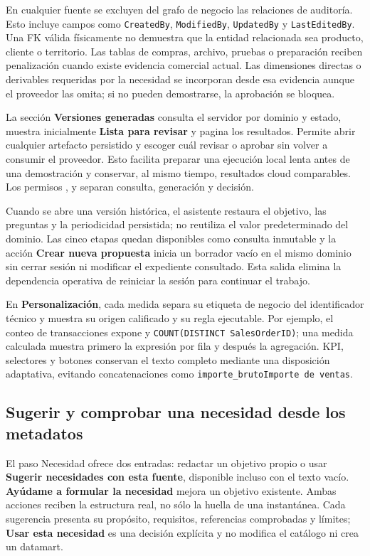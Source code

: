 \documentclass[11pt,letterpaper]{article}
\newcommand{\file}[1]{\texttt{#1}}
\begin{document}
En cualquier fuente se excluyen del grafo de negocio las relaciones de auditoría. Esto incluye campos como \file{CreatedBy}, \file{ModifiedBy}, \file{UpdatedBy} y \file{LastEditedBy}. Una FK válida físicamente no demuestra que la entidad relacionada sea producto, cliente o territorio. Las tablas de compras, archivo, pruebas o preparación reciben penalización cuando existe evidencia comercial actual. Las dimensiones directas o derivables requeridas por la necesidad se incorporan desde esa evidencia aunque el proveedor las omita; si no pueden demostrarse, la aprobación se bloquea.

La sección \textbf{Versiones generadas} consulta el servidor por dominio y estado, muestra inicialmente \textbf{Lista para revisar} y pagina los resultados. Permite abrir cualquier artefacto persistido y escoger cuál revisar o aprobar sin volver a consumir el proveedor. Esto facilita preparar una ejecución local lenta antes de una demostración y conservar, al mismo tiempo, resultados cloud comparables. Los permisos ,  y  separan consulta, generación y decisión.

Cuando se abre una versión histórica, el asistente restaura el objetivo, las preguntas y la periodicidad persistida; no reutiliza el valor predeterminado del dominio. Las cinco etapas quedan disponibles como consulta inmutable y la acción \textbf{Crear nueva propuesta} inicia un borrador vacío en el mismo dominio sin cerrar sesión ni modificar el expediente consultado. Esta salida elimina la dependencia operativa de reiniciar la sesión para continuar el trabajo.

En \textbf{Personalización}, cada medida separa su etiqueta de negocio del identificador técnico y muestra su origen calificado y su regla ejecutable. Por ejemplo, el conteo de transacciones expone  y \file{COUNT(DISTINCT SalesOrderID)}; una medida calculada muestra primero la expresión por fila y después la agregación. KPI, selectores y botones conservan el texto completo mediante una disposición adaptativa, evitando concatenaciones como \file{importe\_brutoImporte de ventas}.

\subsection{Sugerir y comprobar una necesidad desde los metadatos}

El paso Necesidad ofrece dos entradas: redactar un objetivo propio o usar
\textbf{Sugerir necesidades con esta fuente}, disponible incluso con el texto vacío.
\textbf{Ayúdame a formular la necesidad} mejora un objetivo existente. Ambas acciones
reciben la estructura real, no sólo la huella de una instantánea. Cada sugerencia
presenta su propósito, requisitos, referencias comprobadas y límites; \textbf{Usar esta
necesidad} es una decisión explícita y no modifica el catálogo ni crea un datamart.
\end{document}
